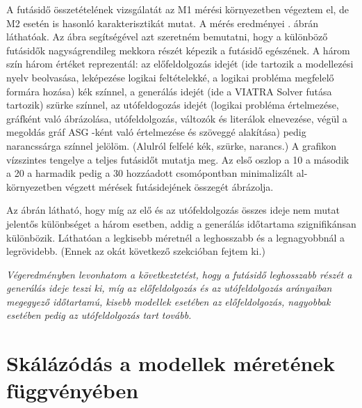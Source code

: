 A futásidő összetételének vizsgálatát az M1 mérési környezetben végeztem el, de M2 esetén is hasonló karakterisztikát mutat. A mérés eredményei  . ábrán láthatóak. Az ábra segítségével azt szeretném bemutatni, hogy a különböző futásidők nagyságrendileg mekkora részét képezik a futásidő egészének. A három szín három értéket reprezentál: az előfeldolgozás idejét (ide tartozik a modellezési nyelv beolvasása, leképezése logikai feltételekké, a logikai probléma megfelelő formára hozása) kék színnel, a generálás idejét (ide a VIATRA Solver futása tartozik) szürke színnel, az utófeldogozás idejét (logikai probléma értelmezése, gráfként való ábrázolása, utófeldolgozás, változók és literálok elnevezése, végül a megoldás gráf ASG -ként való értelmezése és szöveggé alakítása) pedig narancssárga színnel jelölöm. (Alulról felfelé kék, szürke, narancs.) A grafikon vízszintes tengelye a teljes futásidőt mutatja meg. Az első oszlop a 10 a második a 20 a harmadik pedig a 30 hozzáadott csomópontban minimalizált al-környezetben végzett mérések futásidejének összegét ábrázolja. 

Az ábrán látható, hogy míg az elő és az utófeldolgozás összes ideje nem mutat jelentős különbséget a három esetben, addig a generálás időtartama szignifikánsan különbözik. Láthatóan a legkisebb méretnél a leghosszabb és a legnagyobbnál a legrövidebb. (Ennek az okát következő szekcióban fejtem ki.)

\textit{Végeredményben levonhatom a következtetést, hogy a futásidő leghosszabb részét a generálás ideje teszi ki, míg az előfeldolgozás és az utófeldolgozás arányaiban megegyező időtartamú, kisebb modellek esetében az előfeldolgozás, nagyobbak esetében pedig az utófeldolgozás tart tovább.}   

\section{Skálázódás a modellek méretének függvényében}

